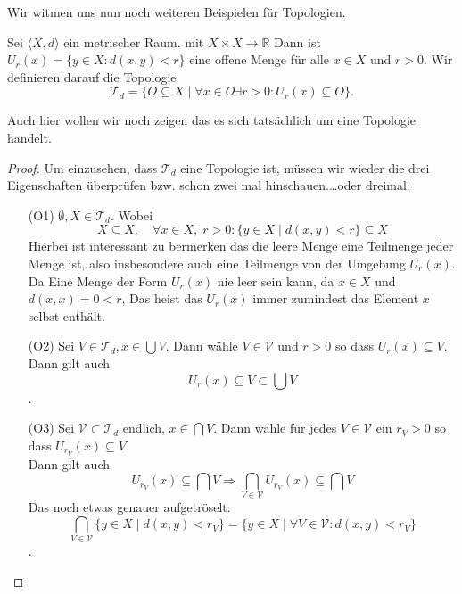 Wir witmen uns nun noch weiteren Beispielen für Topologien. 

{
Sei $\langle X,d \rangle $ ein metrischer Raum. mit $X \times X \to \mathbb{R}$ Dann ist $U_{r}(x) = \{y \in X : d(x,y) < r\}$
eine offene Menge für alle $x \in X$ und $r > 0$. Wir definieren darauf die Topologie 
$$\mathcal{T}_d = \{ O \subseteq X \mid \forall x \in O \exists r > 0 : U_r(x) \subseteq O \}.$$  

Auch hier wollen wir noch zeigen das es sich tatsächlich um eine Topologie handelt.
\begin{proof}
Um einzusehen, dass $\mathcal{T}_d$ eine Topologie ist, müssen wir wieder 
die drei Eigenschaften überprüfen bzw. schon zwei mal hinschauen.\dots oder dreimal:
\begin{itemize}
    \item[(O1)] $\emptyset, X \in \mathcal{T}_d$.
    Wobei 
    $$
    X \subseteq X, \quad 
    \forall x \in X, \; r > 0 : \{ y \in X \mid d(x,y) < r \} \subseteq X
    $$
    Hierbei ist interessant zu bermerken das die leere Menge eine Teilmenge jeder Menge ist, 
    also insbesondere auch eine Teilmenge von der Umgebung $U_r(x)$.
    Da Eine Menge der Form $U_r(x)$ nie leer sein kann, da $x \in X$ und $d(x,x) = 0 < r$, 
    Das heist das $U_r(x)$ immer zumindest das Element $x$ selbst enthält. 

    \item[(O2)] Sei $V \in \mathcal{T}_d, x\in \bigcup V$. Dann wähle $V \in \mathcal{V}$ 
    und $r > 0$ so dass $U_r(x) \subseteq V$. Dann gilt auch 
    $$
    U_r(x) \subseteq V \subset \bigcup V
    $$.
    \item[(O3)] Sei $\mathcal{V} \subset \mathcal{T}_d$ endlich, $x \in \bigcap V$.
    Dann wähle für jedes $V \in \mathcal{V}$ ein $r_V > 0$ so dass
    $U_{r_V}(x) \subseteq V$\\
    Dann gilt auch 
    $$
    U_{r_V}(x) \subseteq \bigcap V \Rightarrow \underset{V \in \mathcal{V}}{\bigcap} U_{r_V}(x) \subseteq \bigcap V
    $$
    Das noch etwas genauer aufgetröselt: 
    $$
    \underset{V \in \mathcal{V}}{\bigcap}\{y \in X \mid d(x,y) < r_V\} 
    = \{y \in X \mid \forall V \in \mathcal{V}: d(x,y) < r_V\}
    $$.
\end{itemize}
\end{proof}
}

